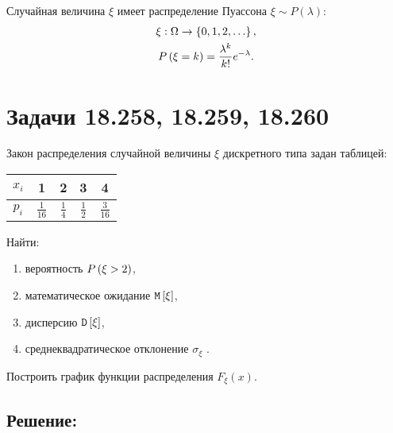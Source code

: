 Случайная величина $\xi$ имеет распределение Пуассона $\xi \sim P(\lambda)$:
\begin{gather}
    \xi : \Omega \rightarrow \set{0, 1, 2, \dots}, \\
    \probability{\xi = k} = \frac{\lambda^k}{k!} e^{-\lambda} .
\end{gather}

\section*{Задачи 18.258, 18.259, 18.260}

Закон распределения случайной величины $\xi$ дискретного типа задан таблицей:
\begin{center}
    \begin{tabular}{|c|c|c|c|c|}
        \hline
        $x_i$ & 1              & 2             & 3             & 4              \\
        \hline
        $p_i$ & $\frac{1}{16}$ & $\frac{1}{4}$ & $\frac{1}{2}$ & $\frac{3}{16}$ \\
        \hline
    \end{tabular}
\end{center}

Найти:
\begin{enumerate}
    \item вероятность $P \left ( \xi > 2 \right )$,
    \item математическое ожидание $\mathtt{M} \left [ \xi \right ]$,
    \item дисперсию $\mathtt{D} \left [ \xi \right ]$,
    \item среднеквадратическое отклонение $\sigma_\xi$ .
\end{enumerate}

Построить график функции распределения $F_\xi(x)$.

\subsection*{Решение:}

